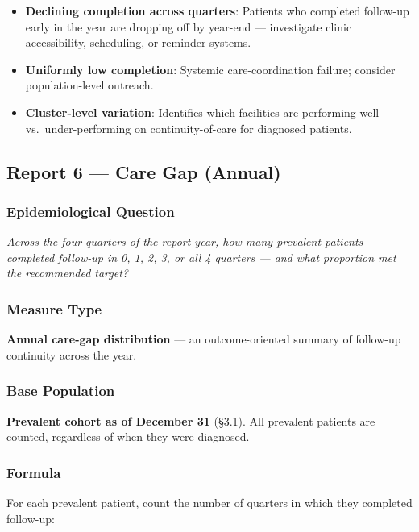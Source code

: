 \documentclass[11pt,a4paper]{article}
\begin{document}
\begin{itemize}[leftmargin=*]
    \item \textbf{Declining completion across quarters}: Patients who completed follow-up early in the year are dropping off by year-end --- investigate clinic accessibility, scheduling, or reminder systems.
    \item \textbf{Uniformly low completion}: Systemic care-coordination failure; consider population-level outreach.
    \item \textbf{Cluster-level variation}: Identifies which facilities are performing well vs.\ under-performing on continuity-of-care for diagnosed patients.
\end{itemize}

\subsection{Report 6 --- Care Gap (Annual)}

\subsubsection{Epidemiological Question}
\textit{Across the four quarters of the report year, how many prevalent patients completed follow-up in 0, 1, 2, 3, or all 4 quarters --- and what proportion met the recommended target?}

\subsubsection{Measure Type}
\textbf{Annual care-gap distribution} --- an outcome-oriented summary of follow-up continuity across the year.

\subsubsection{Base Population}
\textbf{Prevalent cohort as of December 31} (§3.1). All prevalent patients are counted, regardless of when they were diagnosed.

\subsubsection{Formula}

For each prevalent patient, count the number of quarters in which they completed follow-up:
\end{document}
